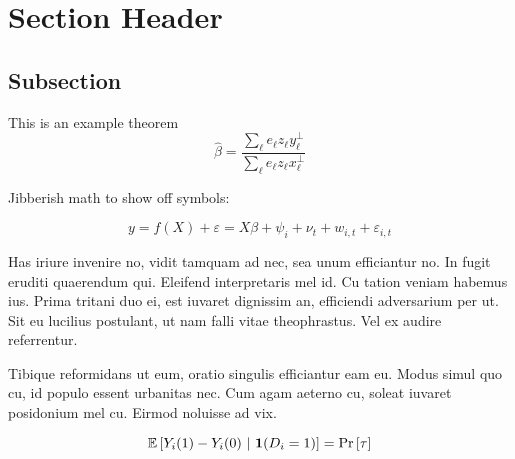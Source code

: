 \documentclass[12pt]{article}
\begin{document}
\section{Section Header}

\subsection{Subsection}

\begin{theorem}\label{thm:residue_thm}
  This is an example theorem \[
    \hat{\beta}=\frac{\sum_{\ell}e_{\ell}z_{\ell}y_{\ell}^{\perp}}{\sum_{\ell}e_{\ell}z_{\ell}x_{\ell}^{\perp}}
  \]
\end{theorem}

Jibberish math to show off symbols:

\begin{equation}\label{eq:fe_reg}
  y = f(X) + \varepsilon = X \beta + \psi_i + \nu_t + w_{i,t} + \varepsilon_{i,t}
\end{equation}

Has iriure invenire no, vidit tamquam ad nec, sea unum efficiantur no. In fugit eruditi quaerendum qui. Eleifend interpretaris mel id. Cu tation veniam habemus ius. Prima tritani duo ei, est iuvaret dignissim an, efficiendi adversarium per ut. Sit eu lucilius postulant, ut nam falli vitae theophrastus. Vel ex audire referrentur.

Tibique reformidans ut eum, oratio singulis efficiantur eam eu. Modus simul quo cu, id populo essent urbanitas nec. Cum agam aeterno cu, soleat iuvaret posidonium mel cu. Eirmod noluisse ad vix.

\[
  \mathbb{E}\left[Y_i(1) - Y_i(0) \ \vert \ \mathbf{1}(D_i = 1)\right] = \text{Pr}\left[\tau\right]
\]
\end{document}
